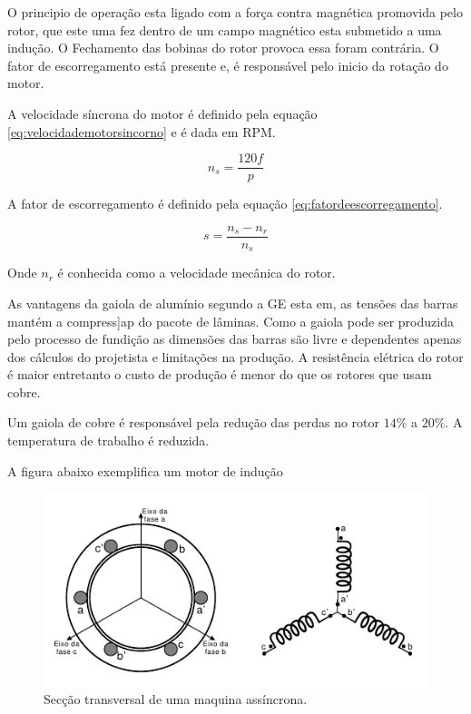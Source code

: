 \documentclass[10pt]{article}
\begin{document}
O principio de operação esta ligado com a força contra magnética promovida pelo rotor, que este uma fez dentro de um campo magnético esta submetido a uma indução. O Fechamento das bobinas do rotor provoca essa foram contrária. O fator de escorregamento está presente e, é responsável pelo inicio da rotação do motor. 

A velocidade síncrona do motor é definido pela equação \ref{eq:velocidademotorsincorno} e é dada em RPM.

\begin{equation} \label{eq:velocidademotorsincorno}
n_s = \frac{120 f}{p}
\end{equation}

A fator de escorregamento é definido pela equação \ref{eq:fatordeescorregamento}.

\begin{equation} \label{eq:fatordeescorregamento}

s = \frac{n_s - n_r}{n_s}

\end{equation}

Onde $n_r$ é conhecida como 
a velocidade mecânica do rotor. 

As vantagens da gaiola de alumínio segundo a GE esta em, as tensões das barras mantém a compress]ap do pacote de lâminas. Como a gaiola pode ser 
produzida pelo processo de fundição as dimensões das barras são livre e 
dependentes apenas dos cálculos do projetista e limitações na produção.
A resistência elétrica do rotor é maior entretanto o custo de produção
é menor do que os rotores que usam cobre.

Um gaiola de cobre é responsável pela redução das perdas no rotor $14 \%$
a $20 \%$. A temperatura de trabalho é reduzida.

A figura abaixo exemplifica um motor de indução

\begin{figure}[!ht]
    \centering
    \includegraphics[scale=0.8]{seccaotransversalmaquinas}
    \caption{Secção transversal de uma maquina assíncrona.}
    \label{fig:motorutilizado}
\end{figure}
\end{document}
